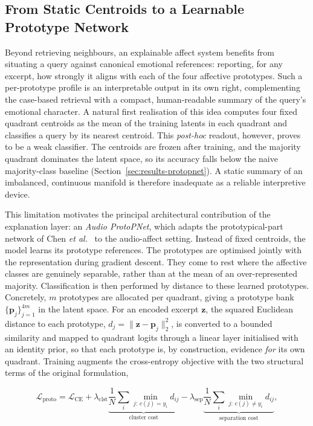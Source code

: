 \documentclass[12pt]{report}
\begin{document}
\subsection{From Static Centroids to a Learnable Prototype Network}
\label{sec:protopnet}

Beyond retrieving neighbours, an explainable affect system benefits from situating a query against canonical emotional references: reporting, for any excerpt, how strongly it aligns with each of the four affective prototypes. Such a per-prototype profile is an interpretable output in its own right, complementing the case-based retrieval with a compact, human-readable summary of the query's emotional character. A natural first realisation of this idea computes four fixed quadrant centroids as the mean of the training latents in each quadrant and classifies a query by its nearest centroid. This \emph{post-hoc} readout, however, proves to be a weak classifier. The centroids are frozen after training, and the majority quadrant dominates the latent space, so its accuracy falls below the naive majority-class baseline (Section~\ref{sec:results-protopnet}). A static summary of an imbalanced, continuous manifold is therefore inadequate as a reliable interpretive device.

This limitation motivates the principal architectural contribution of the explanation layer: an \emph{Audio ProtoPNet}, which adapts the prototypical-part network of Chen \emph{et al.}~\cite{chen_protopnet_2019} to the audio-affect setting. Instead of fixed centroids, the model learns its prototype references. The prototypes are optimised jointly with the representation during gradient descent. They come to rest where the affective classes are genuinely separable, rather than at the mean of an over-represented majority. Classification is then performed by distance to these learned prototypes. Concretely, $m$ prototypes are allocated per quadrant, giving a prototype bank $\{\mathbf{p}_{j}\}_{j=1}^{4m}$ in the latent space. For an encoded excerpt $\mathbf{z}$, the squared Euclidean distance to each prototype, $d_{j} = \lVert \mathbf{z} - \mathbf{p}_{j} \rVert_{2}^{2}$, is converted to a bounded similarity and mapped to quadrant logits through a linear layer initialised with an identity prior, so that each prototype is, by construction, evidence \emph{for} its own quadrant. Training augments the cross-entropy objective with the two structural terms of the original formulation,

\begin{equation}
\label{eq:protopnet}
\mathcal{L}_{\text{proto}}
= \mathcal{L}_{\text{CE}}
+ \lambda_{\text{clst}} \underbrace{\frac{1}{N}\sum_{i} \min_{j:\,c(j)=y_{i}} d_{ij}}_{\text{cluster cost}}
- \lambda_{\text{sep}} \underbrace{\frac{1}{N}\sum_{i} \min_{j:\,c(j)\neq y_{i}} d_{ij}}_{\text{separation cost}},
\end{equation}
\end{document}
